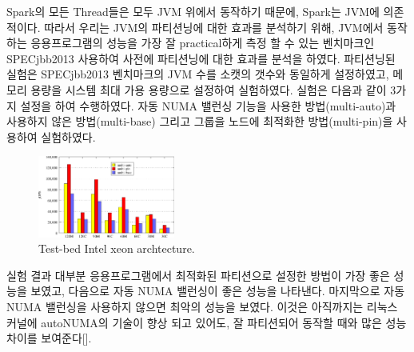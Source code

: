 
\ifkor
Spark의 모든 Thread들은 모두 JVM 위에서 동작하기 때문에, Spark는 JVM에 의존적이다.
따라서 우리는 JVM의 파티션닝에 대한 효과를 분석하기 위해, JVM에서 동작하는 응용프로그램의
성능을 가장 잘 practical하게 측정 할 수 있는 벤치마크인 SPECjbb2013 사용하여 사전에 
파티션닝에 대한 효과를 분석을 하였다. 
파티션닝된  실험은 SPECjbb2013 벤치마크의 JVM 수를 소캣의 갯수와 동일하게 설정하였고, 
메모리 용량을 시스템 최대 가용 용량으로 설정하여 실험하였다. 
실험은 다음과 같이 3가지 설정을 하여 수행하였다. 
자동 NUMA 밸런싱 기능을 사용한 방법(multi-auto)과 사용하지 않은 
방법(multi-base) 그리고 그룹을 노드에 최적화한 방법(multi-pin)을 
사용하여 실험하였다.

\else
\fi

\begin{figure}[h]
  \begin{center}
     \includegraphics[width=0.4\textwidth]{graph/SPECjbb2013}
  \end{center}
  \caption{Test-bed Intel xeon archtecture.}
  \label{fig:basic}
\end{figure}

\ifkor
실험 결과 대부분 응용프로그램에서 최적화된 파티션으로 설정한 방법이 가장 좋은 
성능을 보였고, 다음으로 자동 NUMA 밸런싱이 좋은 성능을 나타낸다. 
마지막으로 자동 NUMA 밸런싱을 사용하지 않으면 최악의 성능을 보였다.
이것은 아직까지는 리눅스 커널에 autoNUMA의 기술이 향상 되고 있어도, 
잘 파티션되어 동작할 때와 많은 성능 차이를 보여준다[]. 
\else
\fi
